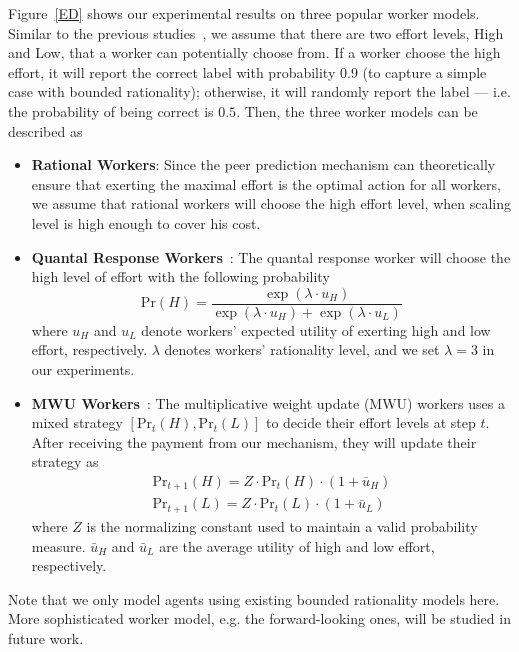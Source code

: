 \documentclass[letterpaper]{article} %
\begin{document}
Figure~\ref{ED} shows our experimental results on three popular worker models.
Similar to the previous studies~\cite{liu2017sequential}, we assume that there are two effort levels, High and Low, that a worker can potentially choose from.
If a worker choose the high effort, it will report the correct label with probability $0.9$ (to capture a simple case with bounded rationality); otherwise, it will randomly report the label --- i.e. the probability of being correct is $0.5$.
Then, the three worker models can be described as
\begin{itemize}
\item \textbf{Rational Workers}: Since the peer prediction mechanism can theoretically ensure that exerting the maximal effort is the optimal action for all workers, we assume that rational workers will choose the high effort level, when scaling level is high enough to cover his cost.
\item \textbf{Quantal Response Workers}~\cite{mckelvey1995quantal}: The quantal response worker will choose the high level of effort with the following probability
\begin{equation}
\text{Pr}(H)= \frac{\exp (\lambda\cdot u_H)}{\exp (\lambda\cdot u_H)+\exp (\lambda\cdot u_L)}
\end{equation}
where $u_H$ and $u_L$ denote workers' expected utility of exerting high and low effort, respectively. $\lambda$ denotes workers' rationality level, and we set $\lambda=3$ in our experiments.
\item \textbf{MWU Workers}~\cite{chastain2014algorithms}: The multiplicative weight update (MWU)  workers uses a mixed strategy $[\text{Pr}_t(H), \text{Pr}_t(L)]$ to decide their effort levels at step $t$. After receiving the payment from our mechanism, they will update their strategy as
\begin{equation}
\begin{split}
\text{Pr}_{t+1}(H) = Z\cdot \text{Pr}_t(H)\cdot (1+\bar{u}_H)\\
\text{Pr}_{t+1}(L) =  Z\cdot \text{Pr}_t(L)\cdot (1+\bar{u}_L)
\end{split}
\end{equation}
where $Z$ is the normalizing constant used to maintain a valid probability measure. $\bar{u}_H$ and $\bar{u}_L$ are the average utility of high and low effort, respectively.
\end{itemize}
Note that we only model agents using existing bounded rationality models here. More sophisticated worker model, e.g. the forward-looking ones, will be studied in future work.
\end{document}
